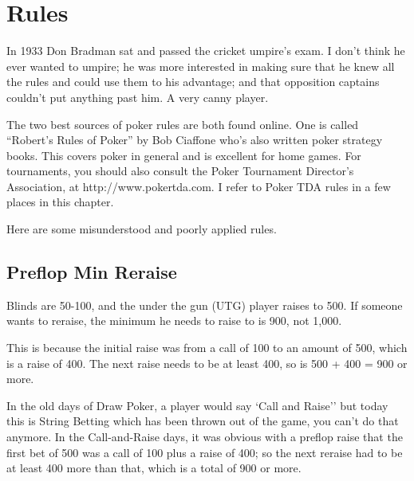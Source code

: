 \chapter{Rules}


In 1933 Don Bradman sat and passed the cricket umpire's exam. I don't
think he ever wanted to umpire; he was more interested in making
sure that he knew all the rules and could use them to his advantage;
and that opposition captains couldn't put anything past him. A very
canny player.

The two best sources of poker rules are both found online.
One is called ``Robert's Rules of Poker'' by Bob Ciaffone
who's also written poker strategy books. This covers
poker in general and is excellent for home games. For tournaments,
you should also consult the Poker Tournament Director's Association,
at http://www.pokertda.com. I refer to Poker TDA rules in a few
places in this chapter.



Here are some misunderstood and poorly applied rules.

\section{Preflop Min Reraise}

Blinds are 50-100, and the under the gun (UTG) player
raises to 500. If someone wants to reraise, the minimum
he needs to raise to is 900, not 1,000. 

This is because the initial raise was from a call of 100 to an
amount of 500, which is a raise of 400. The next raise needs
to be at least 400, so is 500 + 400 = 900 or more.


In the old days of Draw Poker, a player would say `Call and Raise''
but today this is String Betting which has been thrown out of the
game, you can't do that anymore. In the Call-and-Raise days, it was obvious
with a preflop raise that the first bet of 500 was a call of 100 plus
a raise of 400; so the next reraise had to be at least 400 more than
that, which is a total of 900 or more.

